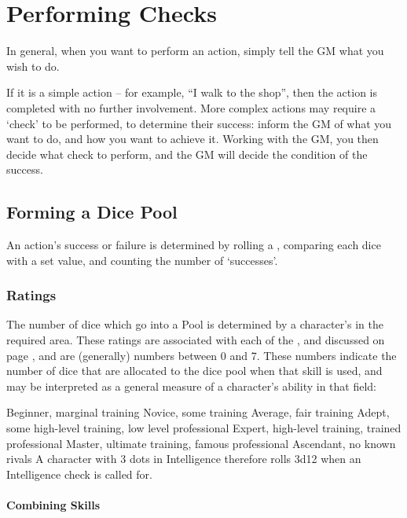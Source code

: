 \chapter{Performing Checks}\label{C:Checks}


In general, when you want to perform an action, simply tell the GM what you wish to do. 

If it is a simple action – for example, “I walk to the shop”, then the action is completed with no further involvement. More complex actions may require a ‘check’ to be performed, to determine their success: inform the GM of what you want to do, and how you want to achieve it. Working with the GM, you then decide what check to perform, and the GM will decide the condition of the success.


\section{Forming a Dice Pool}

An action's success or failure is determined by rolling a , comparing each dice with a set value, and counting the number of `successes'.

\subsection{Ratings}

The number of dice which go into a Pool is determined by a character's  in the required area. These ratings are associated with each of the ,  and  discussed on page \pageref{C:Aspects}, and are (generally) numbers between 0 and 7. These numbers indicate the number of dice that are allocated to the dice pool when that skill is used, and may be interpreted as a general measure of a character's ability in that field:

{Beginner, marginal training}
{Novice, some training}
{Average, fair training}
{Adept, some high-level training, low level professional}
{Expert, high-level training, trained professional}
{Master, ultimate training, famous professional}
{Ascendant, no known rivals}
\normalsize
A character with 3 dots in Intelligence therefore rolls 3d12 when an Intelligence check is called for. 

\subsubsection{Combining Skills}

